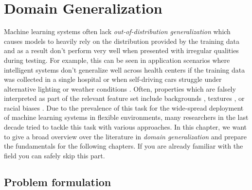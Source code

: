 \newcommand*{\eg}{e.g.\@\xspace}
\newcommand*{\ie}{i.e.\@\xspace}
\newcommand*{\cf}{cf.\@\xspace}
\newcommand{\amsbound}{\textsc{AMSBound}\xspace}
\newcommand{\adabound}{\textsc{AdaBound}\xspace}
\newcommand{\adam}{\textsc{Adam}\xspace}
\newcommand{\momentum}{\textsc{Momentum}\xspace}
\newcommand{\sgd}{\textsc{SGD}\xspace}
\newcommand{\rmsprop}{\textsc{RMSProp}\xspace}
\newcommand{\amsgrad}{\textsc{AMSGrad}\xspace}
\newcommand{\adadelta}{\textsc{Adadelta}\xspace}
\newcommand{\nag}{\textsc{NAG}\xspace}
\newcommand{\nadam}{\textsc{Nadam}\xspace}
\newcommand{\radam}{\textsc{Radam}\xspace}
\newcommand{\norm}[1]{\left\lVert#1\right\rVert}
\newcommand{\plus}{\raisebox{.4\height}{\scalebox{.6}{+}}}
\newcommand{\minus}{\raisebox{.4\height}{\scalebox{.8}{-}}}
\newcommand{\imagequadsize}{1cm}
\newcommand{\domainsize}[1]{\scriptsize{#1}}


\chapter{Domain Generalization} %
\label{DomainGeneralization} 

Machine learning systems often lack \emph{out-of-distribution generalization} which causes models to heavily rely on the distribution provided by the training data and as a result don't perform very well when presented with irregular qualities during testing. For example, this can be seen in application scenarios where intelligent systems don't generalize well across health centers if the training data was collected in a single hospital \citep{Castro_2020, AlBadawy2018, PeroneBBC19} or when self-driving cars struggle under alternative lighting or weather conditions \citep{DaiG18, VolkMBH019}. Often, properties which are falsely interpreted as part of the relevant feature set include backgrounds \citep{BeeryHP18}, textures \citep{GeirhosRMBWB19}, or racial biases \citep{StockC18}. Due to the prevalence of this task for the wide-spread deployment of machine learning systems in flexible environments, many researchers in the last decade tried to tackle this task with various approaches. In this chapter, we want to give a broad overview over the literature in \emph{domain generalization} and prepare the fundamentals for the following chapters. If you are already familiar with the field you can safely skip this part.

\section{Problem formulation}
\label{sec:domain_gen_problem}

